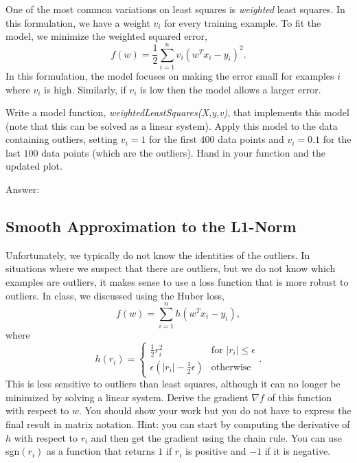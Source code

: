 \documentclass{article}
\def\ans#1{\par\gre{Answer: #1}}
\def\blu#1{{\color{blu}#1}}
\def\gre#1{{\color{gre}#1}}
\def\half{\frac 1 2}
\begin{document}
One of the most common variations on least squares is \emph{weighted} least squares. In this formulation, we have a weight $v_i$ for every training example. To fit the model, we minimize the weighted squared error,
\[
f(w) =  \frac{1}{2}\sum_{i=1}^n v_i(w^Tx_i - y_i)^2.
\]
In this formulation, the model focuses on making the error small for examples $i$ where $v_i$ is high. Similarly, if $v_i$ is low then the model allows a larger error.

Write a model function, \emph{weightedLeastSquares(X,y,v)}, that implements this model (note that this can be solved as a linear system).
Apply this model to the data containing outliers, setting $v_i = 1$ for the first $400$ data points and $v_i = 0.1$ for the last $100$ data points (which are the outliers). \blu{Hand in your function and the updated plot}.

\ans{}


\pagebreak

\subsection{Smooth Approximation to the L1-Norm}

Unfortunately, we typically do not know the identities of the outliers. In situations where we suspect that there are outliers, but we do not know which examples are outliers, it makes sense to use a loss function that is more robust to outliers. In class, we discussed using the Huber loss,
\[
f(w) = \sum_{i=1}^n h(w^Tx_i  -y_i),
\]
where
\[
h(r_i) =
\begin{cases}
\half r_i^2 & \text{for $|r_i| \leq \epsilon$}\\
\epsilon(|r_i| - \half \epsilon) & \text{otherwise}
\end{cases}.
\]
This is less sensitive to outliers than least squares, although it can no longer be minimized by solving a linear system.
 \blu{Derive
 the gradient $\nabla f$ of this function with respect to $w$. You should show your work but you do not have to express the final result in matrix notation.}
 Hint: you can start by computing the derivative of $h$ with respect to $r_i$ and then get the gradient using the chain rule. You can use sgn$(r_i)$ as a function that returns $1$ if $r_i$ is positive and $-1$ if it is negative.
\end{document}
